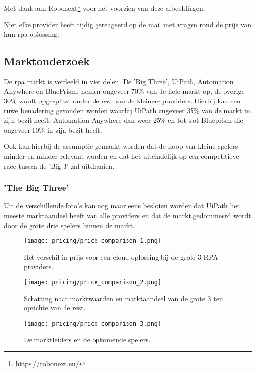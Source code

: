 \chapter{}

Met dank aan Robonext\footnote{https://robonext.eu/} voor het voorzien van deze afbeeldingen.

Niet elke provider heeft tijdig gereageerd op de mail met vragen rond de prijs van hun \acrshort{rpa} oplossing.

\section{Marktonderzoek}
De \acrshort{rpa} markt is verdeeld in vier delen. De 'Big Three', UiPath, Automation Anywhere en BluePrism, nemen ongeveer 70\% van de hele markt op, de overige 30\% wordt opgesplitst onder de rest van de kleinere providers. Hierbij kan een ruwe benadering gevonden worden waarbij UiPath ongeveer 35\% van de markt in zijn bezit heeft, Automation Anywhere dan weer 25\% en tot slot Blueprism die ongeveer 10\% in zijn bezit heeft. \autocite{marktRPA}

Ook kan hierbij de assumptie gemaakt worden dat de hoop van kleine spelers minder en minder relevant worden en dat het uiteindelijk op een competitieve race tussen de 'Big 3' zal uitdraaien. \autocite{marktRPA}

\subsection{'The Big Three'}
Uit de verschillende foto's kan nog maar eens besloten worden dat UiPath het meeste marktaandeel heeft van alle providers en dat de markt gedomineerd wordt door de grote drie spelers binnen de markt. 
\begin{figure}[h!]
	\texttt{[image: pricing/price\_comparison\_1.png]}
	\caption[Cloud editie benchmarks]{Het verschil in prijs voor een cloud oplossing bij de grote 3 RPA providers.}
	\label{fig:price_1}
\end{figure}
\begin{figure}[h!]
	\texttt{[image: pricing/price\_comparison\_2.png]}
	\caption[Grote 3 Revenue Streams]{Schatting naar marktwaarden en marktaandeel van de grote 3 ten opzichte van de rest.}
	\label{fig:price_2}
\end{figure}
\begin{figure}[h!]
	\texttt{[image: pricing/price\_comparison\_3.png]}
	\caption[Benchmarkings]{De marktleiders en de opkomende spelers.}
	\label{fig:price_3}
\end{figure}

